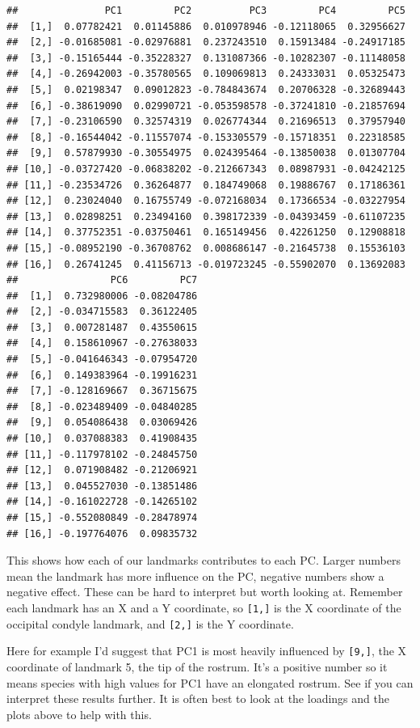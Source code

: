 \documentclass[]{book}
\theoremstyle{definition}
\theoremstyle{definition}
\theoremstyle{definition}
\theoremstyle{remark}
\begin{document}
\begin{verbatim}
##               PC1         PC2          PC3         PC4         PC5
##  [1,]  0.07782421  0.01145886  0.010978946 -0.12118065  0.32956627
##  [2,] -0.01685081 -0.02976881  0.237243510  0.15913484 -0.24917185
##  [3,] -0.15165444 -0.35228327  0.131087366 -0.10282307 -0.11148058
##  [4,] -0.26942003 -0.35780565  0.109069813  0.24333031  0.05325473
##  [5,]  0.02198347  0.09012823 -0.784843674  0.20706328 -0.32689443
##  [6,] -0.38619090  0.02990721 -0.053598578 -0.37241810 -0.21857694
##  [7,] -0.23106590  0.32574319  0.026774344  0.21696513  0.37957940
##  [8,] -0.16544042 -0.11557074 -0.153305579 -0.15718351  0.22318585
##  [9,]  0.57879930 -0.30554975  0.024395464 -0.13850038  0.01307704
## [10,] -0.03727420 -0.06838202 -0.212667343  0.08987931 -0.04242125
## [11,] -0.23534726  0.36264877  0.184749068  0.19886767  0.17186361
## [12,]  0.23024040  0.16755749 -0.072168034  0.17366534 -0.03227954
## [13,]  0.02898251  0.23494160  0.398172339 -0.04393459 -0.61107235
## [14,]  0.37752351 -0.03750461  0.165149456  0.42261250  0.12908818
## [15,] -0.08952190 -0.36708762  0.008686147 -0.21645738  0.15536103
## [16,]  0.26741245  0.41156713 -0.019723245 -0.55902070  0.13692083
##                PC6         PC7
##  [1,]  0.732980006 -0.08204786
##  [2,] -0.034715583  0.36122405
##  [3,]  0.007281487  0.43550615
##  [4,]  0.158610967 -0.27638033
##  [5,] -0.041646343 -0.07954720
##  [6,]  0.149383964 -0.19916231
##  [7,] -0.128169667  0.36715675
##  [8,] -0.023489409 -0.04840285
##  [9,]  0.054086438  0.03069426
## [10,]  0.037088383  0.41908435
## [11,] -0.117978102 -0.24845750
## [12,]  0.071908482 -0.21206921
## [13,]  0.045527030 -0.13851486
## [14,] -0.161022728 -0.14265102
## [15,] -0.552080849 -0.28478974
## [16,] -0.197764076  0.09835732
\end{verbatim}

This shows how each of our landmarks contributes to each PC. Larger
numbers mean the landmark has more influence on the PC, negative numbers
show a negative effect. These can be hard to interpret but worth looking
at. Remember each landmark has an X and a Y coordinate, so
\texttt{{[}1,{]}} is the X coordinate of the occipital condyle landmark,
and \texttt{{[}2,{]}} is the Y coordinate.

Here for example I'd suggest that PC1 is most heavily influenced by
\texttt{{[}9,{]}}, the X coordinate of landmark 5, the tip of the
rostrum. It's a positive number so it means species with high values for
PC1 have an elongated rostrum. See if you can interpret these results
further. It is often best to look at the loadings and the plots above to
help with this.
\end{document}

